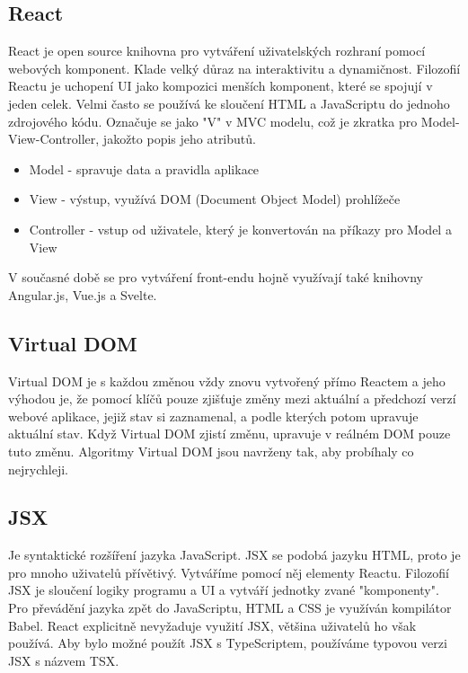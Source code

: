 \subsection{React}
React je open source knihovna pro vytváření uživatelských rozhraní pomocí webových komponent. Klade velký důraz na interaktivitu a dynamičnost. Filozofií Reactu je uchopení UI jako kompozici menších komponent, které se spojují v jeden celek. Velmi často se používá ke sloučení HTML a JavaScriptu do jednoho zdrojového kódu. Označuje se jako "V" v MVC modelu, což je zkratka pro Model-View-Controller, jakožto popis jeho atributů. \cite{React}

\begin{itemize}
\item Model - spravuje data a pravidla aplikace
\item View - výstup, využívá DOM (Document Object Model) prohlížeče
\item Controller - vstup od uživatele, který je konvertován na příkazy pro Model a View\cite{Mosh}
\end{itemize}

V současné době se pro vytváření front-endu hojně využívají také knihovny Angular.js, Vue.js a Svelte.

\subsection{Virtual DOM}
Virtual DOM je s každou změnou vždy znovu vytvořený přímo Reactem a jeho výhodou je, že pomocí klíčů pouze zjišťuje změny mezi aktuální a předchozí verzí webové aplikace, jejiž stav si zaznamenal, a podle kterých potom upravuje aktuální stav. Když Virtual DOM zjistí změnu, upravuje v reálném DOM pouze tuto změnu. Algoritmy Virtual DOM jsou navrženy tak, aby probíhaly co nejrychleji.
\cite{VirtualDOM}

\subsection{JSX}
Je syntaktické rozšíření jazyka JavaScript. JSX se podobá jazyku HTML, proto je pro mnoho uživatelů přívětivý. Vytváříme pomocí něj elementy Reactu. Filozofií JSX je sloučení logiky programu a UI a vytváří jednotky zvané "komponenty". Pro převádění jazyka zpět do JavaScriptu, HTML a CSS je využíván kompilátor Babel. React explicitně nevyžaduje využití JSX, většina uživatelů ho však používá. Aby bylo možné použít JSX s TypeScriptem, používáme typovou verzi JSX s názvem TSX.\cite{JSX}

